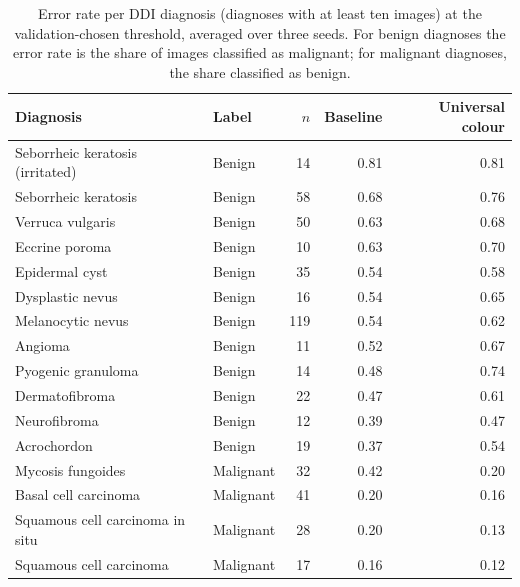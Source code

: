 \begin{table}[t]
\caption{Error rate per DDI diagnosis (diagnoses with at least ten images) at the validation-chosen threshold, averaged over three seeds. For benign diagnoses the error rate is the share of images classified as malignant; for malignant diagnoses, the share classified as benign.}
\label{tab:diag}
\centering
\footnotesize
\begin{tabular}{@{}llrrr@{}}
\toprule
Diagnosis & Label & $n$ & Baseline & Universal colour \\
\midrule
Seborrheic keratosis (irritated) & Benign & 14 & 0.81 & 0.81 \\
Seborrheic keratosis & Benign & 58 & 0.68 & 0.76 \\
Verruca vulgaris & Benign & 50 & 0.63 & 0.68 \\
Eccrine poroma & Benign & 10 & 0.63 & 0.70 \\
Epidermal cyst & Benign & 35 & 0.54 & 0.58 \\
Dysplastic nevus & Benign & 16 & 0.54 & 0.65 \\
Melanocytic nevus & Benign & 119 & 0.54 & 0.62 \\
Angioma & Benign & 11 & 0.52 & 0.67 \\
Pyogenic granuloma & Benign & 14 & 0.48 & 0.74 \\
Dermatofibroma & Benign & 22 & 0.47 & 0.61 \\
Neurofibroma & Benign & 12 & 0.39 & 0.47 \\
Acrochordon & Benign & 19 & 0.37 & 0.54 \\
Mycosis fungoides & Malignant & 32 & 0.42 & 0.20 \\
Basal cell carcinoma & Malignant & 41 & 0.20 & 0.16 \\
Squamous cell carcinoma in situ & Malignant & 28 & 0.20 & 0.13 \\
Squamous cell carcinoma & Malignant & 17 & 0.16 & 0.12 \\
\bottomrule
\end{tabular}
\end{table}
